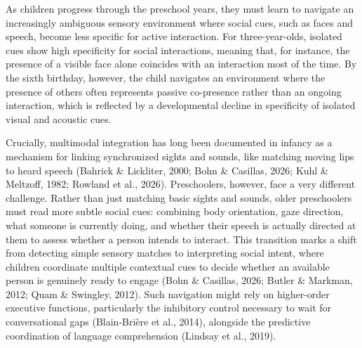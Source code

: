 \documentclass[
  english,
  12pt,
  man,floatsintext]{apa6}
\begin{document}
As children progress through the preschool years, they must learn to navigate an increasingly ambiguous sensory environment where social cues, such as faces and speech, become less specific for active interaction. For three-year-olds, isolated cues show high specificity for social interactions, meaning that, for instance, the presence of a visible face alone coincides with an interaction most of the time. By the sixth birthday, however, the child navigates an environment where the presence of others often represents passive co-presence rather than an ongoing interaction, which is reflected by a developmental decline in specificity of isolated visual and acoustic cues.

Crucially, multimodal integration has long been documented in infancy as a mechanism for linking synchronized sights and sounds, like matching moving lips to heard speech (Bahrick \& Lickliter, 2000; Bohn \& Casillas, 2026; Kuhl \& Meltzoff, 1982; Rowland et al., 2026). Preschoolers, however, face a very different challenge. Rather than just matching basic sights and sounds, older preschoolers must read more subtle social cues: combining body orientation, gaze direction, what someone is currently doing, and whether their speech is actually directed at them to assess whether a person intends to interact. This transition marks a shift from detecting simple sensory matches to interpreting social intent, where children coordinate multiple contextual cues to decide whether an available person is genuinely ready to engage (Bohn \& Casillas, 2026; Butler \& Markman, 2012; Quam \& Swingley, 2012). Such navigation might rely on higher-order executive functions, particularly the inhibitory control necessary to wait for conversational gaps (Blain-Brière et al., 2014), alongside the predictive coordination of language comprehension (Lindsay et al., 2019).
\end{document}
